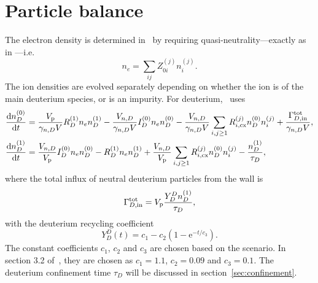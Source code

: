 \documentclass{notes}
\newcommand{\ee}{\mathrm{e}}
\newcommand{\Vp}{V_{\rm p}}
\begin{document}
    \section{Particle balance}\label{sec:particles}
    The electron density is determined in \DYON\ by requiring 
    quasi-neutrality---exactly as in \DREAM---i.e.\
    \begin{equation}
        n_e = \sum_{ij} Z_{0i}^{(j)} n_i^{(j)}.
    \end{equation}
    The ion densities are evolved separately depending on whether the ion is of
    the main deuterium species, or is an impurity. For deuterium, \DYON\ uses
    \begin{equation}\label{eq:nD}
        \begin{aligned}
            \frac{\dd n_D^{(0)}}{\dd t} &=
                \frac{\Vp}{\gamma_{n,D}V}R_D^{(1)}n_en_D^{(1)}
                -\frac{V_{n,D}}{\gamma_{n,D}V}I_D^{(0)}n_en_D^{(0)}
                -\frac{V_{n,D}}{\gamma_{n,D}V}\sum_{i,j\geq 1} R_{i,{\rm cx}}^{(j)}n_D^{(0)}n_i^{(j)}
                + \frac{\Gamma_{D,{\rm in}}^{\rm tot}}{\gamma_{n,D}V},\\
            \frac{\dd n_D^{(1)}}{\dd t} &=
                \frac{V_{n,D}}{\Vp}I_D^{(0)}n_en_D^{(0)}
                -R_D^{(1)}n_en_D^{(1)}
                +\frac{V_{n,D}}{\Vp}\sum_{i,j\geq1} R_{i,{\rm cx}}^{(j)} n_D^{(0)}n_i^{(j)}
                -\frac{n_D^{(1)}}{\tau_D},
        \end{aligned}
    \end{equation}
    where the total influx of neutral deuterium particles from the wall is
    \begin{equation}
        \Gamma_{D,{\rm in}}^{\rm tot} = \Vp\frac{Y_D^D n_D^{(1)}}{\tau_D},
    \end{equation}
    with the deuterium recycling coefficient
    \begin{equation}\label{eq:deut:recyc}
        Y_D^D(t) = c_1 - c_2\left( 1-\ee^{-t/c_3} \right).
    \end{equation}
    The constant coefficients $c_1$, $c_2$ and $c_3$ are chosen based on the
    scenario. In section 3.2 of~\cite{Kim2012}, they are chosen as $c_1=1.1$,
    $c_2=0.09$ and $c_3=0.1$. The deuterium confinement time $\tau_D$ will be
    discussed in section~\ref{sec:confinement}.
\end{document}
